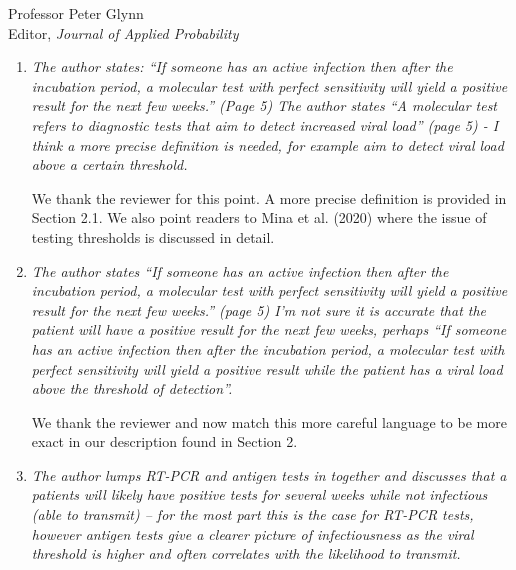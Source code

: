 \documentclass[11pt]{letter} %
\begin{document}
\begin{letter}{Professor
	Peter Glynn\\
	Editor, {\em Journal of Applied Probability}}
\begin{enumerate}
Remark 1 has been added at the end of the introduction to contextualize the manuscript.  Specifically we clarify that our manuscript focuses on COVID-19 case count, testing, and death data collected from April through February 2021 and therefore the numbers presented on disease dynamics are based on the original strain.  While using the framework to account for selection bias and measurement error for data arising from the delta and omicron strains would require additional work, the framework would remain an appropriate tool for this task.


\vspace{5mm}
\item {\it The author states: “If someone has an active infection then after the incubation period, a molecular test with perfect sensitivity will yield a positive result for the next few weeks.” (Page 5) The author states “A molecular test refers to diagnostic tests that aim to detect increased viral load” (page 5) - I think a more precise definition is needed, for example aim to detect viral load above a certain threshold.}
\vspace{5mm}

We thank the reviewer for this point. A more precise definition is provided in Section 2.1.  We also point readers to Mina et al. (2020) where the issue of testing thresholds is discussed in detail.

\vspace{5mm}
\item {\it The author states “If someone has an active infection then after the incubation period, a molecular test with perfect sensitivity will yield a positive result for the next few weeks.” (page 5) I’m not sure it is accurate that the patient will have a positive result for the next few weeks, perhaps “If someone has an active infection then after the incubation period, a molecular test with perfect sensitivity will yield a positive result while the patient has a viral load above the threshold of detection”.}
\vspace{5mm}

We thank the reviewer and now match this more careful language to be more exact in our description found in Section 2.
\vspace{5mm}
\item {\it The author lumps RT-PCR and antigen tests in together and discusses that a patients will likely have positive tests for several weeks while not infectious (able to transmit) – for the most part this is the case for RT-PCR tests, however antigen tests give a clearer picture of infectiousness as the viral threshold is higher and often correlates with the likelihood to transmit.}


\end{enumerate}
\end{letter}
\end{document}
